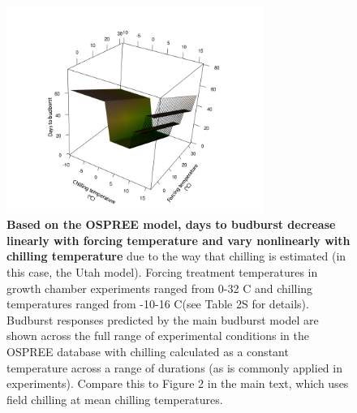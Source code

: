 \documentclass{article}
\begin{document}
\begin{figure}[h!]
\centering
\noindent \includegraphics[width=0.75\textwidth]{..//..//analyses/bb_analysis/figures/bbmod_3dplot_utah.png}
\caption{\textbf{Based on the OSPREE model, days to budburst decrease linearly with forcing temperature and vary nonlinearly with chilling temperature} due to the way that chilling is estimated (in this case, the Utah model). Forcing treatment temperatures in growth chamber experiments ranged from 0-32 \degree C and chilling temperatures ranged from -10-16 \degree C(see Table 2S for details). Budburst responses predicted by the main budburst model are shown across the full range of experimental conditions in the OSPREE database with chilling calculated as a constant temperature across a range of durations (as  is commonly applied in experiments). Compare  this to Figure 2 in the main text, which uses field chilling at mean chilling temperatures. }
\label{fig:fagsyllat}
\end{figure}
\end{document}
